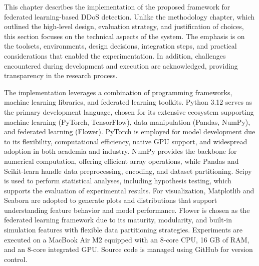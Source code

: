 This chapter describes the implementation of the proposed framework for federated learning-based DDoS detection. Unlike the methodology chapter, which outlined the high-level design, evaluation strategy, and justification of choices, this section focuses on the technical aspects of the system. The emphasis is on the toolsets, environments, design decisions, integration steps, and practical considerations that enabled the experimentation. In addition, challenges encountered during development and execution are acknowledged, providing transparency in the research process.

The implementation leverages a combination of programming frameworks, machine learning libraries, and federated learning toolkits. Python 3.12 \citep{python} serves as the primary development language, chosen for its extensive ecosystem supporting machine learning (PyTorch, TensorFlow), data manipulation (Pandas, NumPy), and federated learning (Flower). PyTorch \citep{pytorch} is employed for model development due to its flexibility, computational efficiency, native GPU support, and widespread adoption in both academia and industry. NumPy \citep{numpy} provides the backbone for numerical computation, offering efficient array operations, while Pandas \citep{pandas} and Scikit-learn \citep{sklearn} handle data preprocessing, encoding, and dataset partitioning. Scipy \citep{scipy} is used to perform statistical analyses, including hypothesis testing, which supports the evaluation of experimental results. For visualization, Matplotlib \citep{matplotlib} and Seaborn \citep{seaborn} are adopted to generate plots and distributions that support understanding feature behavior and model performance. Flower \citep{flower} is chosen as the federated learning framework due to its maturity, modularity, and built-in simulation features with flexible data partitioning strategies. Experiments are executed on a MacBook Air M2 equipped with an 8-core CPU, 16 GB of RAM, and an 8-core integrated GPU. Source code is managed using GitHub for version control.

